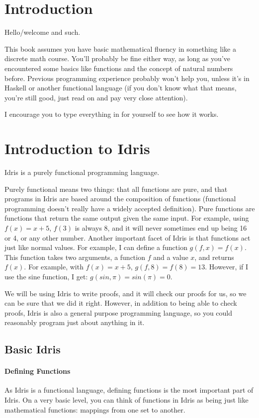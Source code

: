 \documentclass{article}
\begin{document}
\section{Introduction}
Hello/welcome and such.

This book assumes you have basic mathematical fluency in something like a discrete math course.
You'll probably be fine either way, as long as you've encountered some basics like functions and the concept of natural numbers before.
Previous programming experience probably won't help you, unless it's in Haskell or another functional language (if you don't know what that means, you're still good, just read on and pay very close attention).

I encourage you to type everything in for yourself to see how it works.

\section{Introduction to Idris}

Idris is a purely functional programming language.

Purely functional means two things: that all functions are pure, and that programs in Idris are based around the composition of functions (functional programming doesn't really have a widely accepted definition).
Pure functions are functions that return the same output given the same input.
For example, using $f(x) = x + 5$, $f(3)$ is always 8, and it will never sometimes end up being 16 or 4, or any other number.
Another important facet of Idris is that functions act just like normal values.
For example, I can define a function $g(f, x) = f(x)$.
This function takes two arguments, a function $f$ and a value $x$, and returns $f(x)$.
For example, with $f(x) = x + 5$, $g(f, 8) = f(8) = 13$.
However, if I use the sine function, I get: $g(sin, \pi) = sin(\pi) = 0$.

We will be using Idris to write proofs, and it will check our proofs for us, so we can be sure that we did it right.
However, in addition to being able to check proofs, Idris is also a general purpose programming language, so you could reasonably program just about anything in it.

\subsection{Basic Idris}
\paragraph{Defining Functions}
As Idris is a functional language, defining functions is the most important part of Idris.
On a very basic level, you can think of functions in Idris as being just like mathematical functions: mappings from one set to another.
\end{document}
